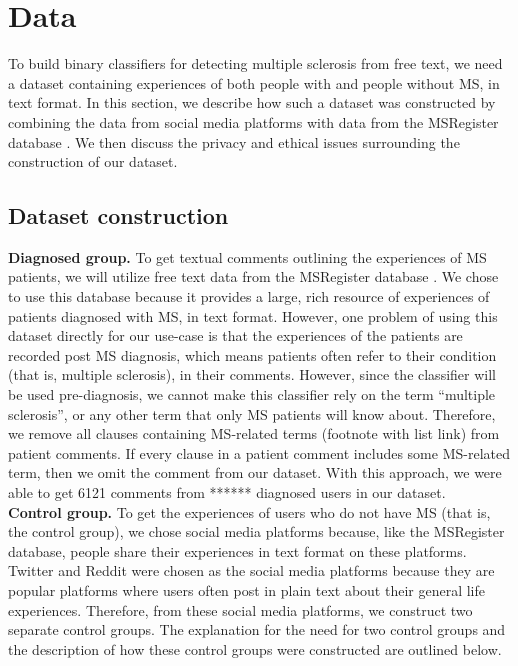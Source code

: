 \documentclass[11pt,a4paper]{article}
\begin{document}
\section{Data}
\label{sec:data}
To build binary classifiers for detecting multiple sclerosis from free text, we need a dataset containing experiences of both people with and people without MS, in text format. In this section, we describe how such a dataset was constructed by combining the data from social media platforms with data from the MSRegister database \citep{Ford:12}. We then discuss the privacy and ethical issues surrounding the construction of our dataset.
\subsection{Dataset construction}
\textbf{Diagnosed group.} To get textual comments outlining the experiences of MS patients, we will utilize free text data from the MSRegister database \citep{Ford:12}. We chose to use this database because it provides a large, rich resource of experiences of patients diagnosed with MS, in text format. However, one problem of using this dataset directly for our use-case is that the experiences of the patients are recorded post MS diagnosis, which means patients often refer to their condition (that is, multiple sclerosis), in their comments. However, since the classifier will be used pre-diagnosis, we cannot make this classifier rely on the term “multiple sclerosis”, or any other term that only MS patients will know about. Therefore, we remove all clauses containing MS-related terms (footnote with list link) from patient comments. If every clause in a patient comment includes some MS-related term, then we omit the comment from our dataset. With this approach, we were able to get 6121 comments from ****** diagnosed users in our dataset. \\
\indent \textbf{Control group.} To get the experiences of users who do not have MS (that is, the control group), we chose social media platforms because, like the MSRegister database, people share their experiences in text format on these platforms. Twitter and Reddit were chosen as the social media platforms because they are popular platforms where users often post in plain text about their general life experiences. Therefore, from these social media platforms, we construct two separate control groups. The explanation for the need for two control groups and the description of how these control groups were constructed are outlined below. \\
\end{document}
